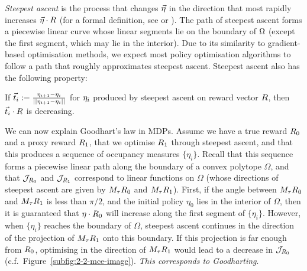 \emph{Steepest ascent} is the process that changes $\vec{\eta}$ in the direction that most rapidly increases $\vec{\eta}\cdot R$
(for a formal definition, see \cite{chang_steepest_1989} or \cite{denel_steepest_1981}). The path of steepest ascent forms a piecewise linear curve whose linear segments lie on the boundary of $\Omega$ (except the first segment, which may lie in the interior). Due to its similarity to gradient-based optimisation methods, we expect most policy optimisation algorithms to follow a path that roughly approximates steepest ascent. 
Steepest ascent also has the following property:

\begin{proposition}\label{prop:concave_proof}
If $\vec{t}_i := \frac{\eta_{i+1}-\eta_i}{||\eta_{i+1}-\eta_i||}$ for $\eta_i$ produced by steepest ascent on reward vector $R$, then $\vec{t}_i \cdot R$ is decreasing. 
\end{proposition}

We can now explain Goodhart's law in MDPs.
Assume we have a true reward $R_0$ and a proxy reward $R_1$, that we optimise $R_1$ through steepest ascent, and that this produces a sequence of occupancy measures $\{\eta_i\}$.
Recall that this sequence forms a piecewise linear path along the boundary of a convex polytope $\Omega$, and that $\mathcal{J}_{R_0}$ and $\mathcal{J}_{R_1}$ correspond to linear functions on $\Omega$ (whose directions of steepest ascent are given by $M_\tau R_0$ and $M_\tau R_1$).
First, if the angle between $M_\tau R_0$ and $M_\tau R_1$ is less than $\pi/2$, and the initial policy $\eta_0$ lies in the interior of $\Omega$, then it is guaranteed that $\eta \cdot R_0$ will increase along the first segment of $\{\eta_i\}$.
However, when $\{\eta_i\}$ reaches the boundary of $\Omega$, steepest ascent continues in the direction of the projection of $M_\tau R_1$ onto this boundary. If this projection is far enough from $R_0$, optimising in the direction of $M_\tau R_1$ would lead to a decrease in $\mathcal{J}_{R_0}$ (c.f.\ Figure~\ref{subfig:2-2-mce-image}). \emph{This corresponds to Goodharting}.


